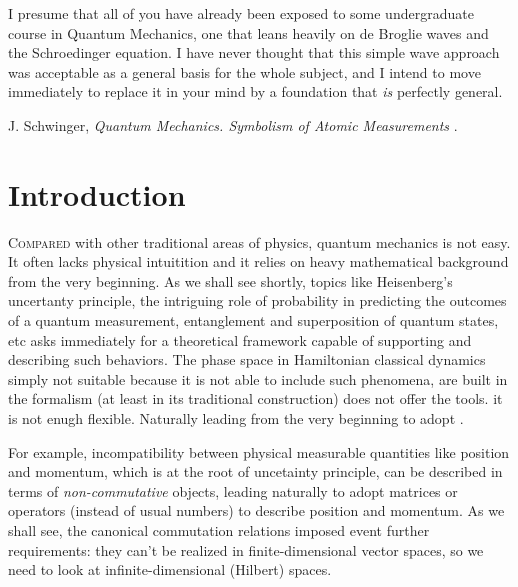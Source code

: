 


\label{chp:fundamentals} 


\begin{refsection}
\begin{quoting}
   \openquote 
   I presume that all of you have already been exposed to some undergraduate
   course in Quantum Mechanics, one that leans heavily on de Broglie waves and
   the Schroedinger equation. I have never thought that this simple wave
   approach was acceptable as a general basis for the whole subject, and I
   intend to move immediately to replace it in your mind by a foundation that
   \emph{is} perfectly general.~\closequote
   \begin{flushright}
       J. Schwinger,
       \emph{Quantum Mechanics. Symbolism of Atomic Measurements}
       \textcite{Schwinger:2001}.
    \end{flushright}
\end{quoting}

\section{Introduction}

\lettrine{C}{ompared} 
with other traditional areas of physics, quantum mechanics is not easy. 
It often lacks physical intuitition and it relies on heavy mathematical
background from the very beginning.
As we shall see shortly, 
topics like Heisenberg's uncertanty principle, the intriguing role of probability in predicting the
outcomes of a quantum measurement, entanglement and superposition of quantum
states, etc
asks immediately for a theoretical framework capable of supporting and
describing such behaviors. The phase space in Hamiltonian classical dynamics 
simply not suitable because it is  not
able to include such phenomena, 
are built  in the formalism 
(at least in its traditional construction)
does not offer the tools. 
it is not enugh flexible. 
Naturally leading from the very beginning to adopt .


For example, incompatibility between physical measurable quantities like position and
momentum, which is at the root of uncetainty principle, can be described in
terms of \emph{non-commutative} objects, leading naturally to adopt matrices or
operators (instead of usual numbers) to describe position and momentum.
As we shall see, the canonical commutation relations imposed event further
requirements: they can't be realized in finite-dimensional vector spaces,
so we need to look at infinite-dimensional (Hilbert) spaces. 


\end{refsection}
